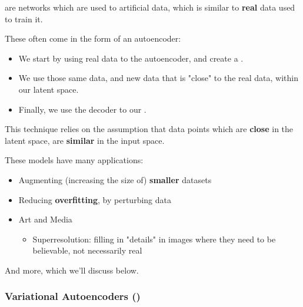         \begin{definition}
             are networks which are used to  artificial data, which is similar to \textbf{real} data used to train it.

            These often come in the form of an autoencoder: 
            \begin{itemize}
                \item We start by using real data to  the autoencoder, and create a .
                \item We use those same data, and  new data that is "close" to the real data, within our latent space.
                \item Finally, we use the decoder to  our .
            \end{itemize}

            \subsecdiv

            This technique relies on the assumption that data points which are \textbf{close} in the latent space, are \textbf{similar} in the input space.
        \end{definition}

        These models have many applications:

        \begin{itemize}
            \item Augmenting (increasing the size of) \textbf{smaller} datasets 
            \item Reducing \textbf{overfitting}, by perturbing data
            \item Art and Media
                \begin{itemize}
                    \item \miniex Superresolution: filling in "details" in images where they need to be believable, not necessarily real
                \end{itemize}
            
        \end{itemize}

        And more, which we'll discuss below.

        \subsubsection{Variational Autoencoders ()}

